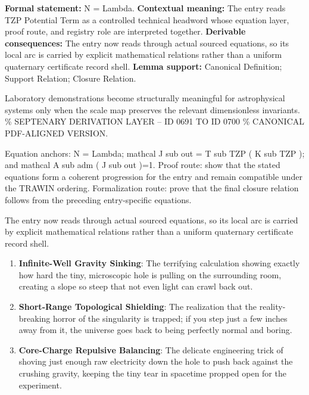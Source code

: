 \begingroup\footnotesize\setlength{\emergencystretch}{3em}\sloppy
\textbf{Formal statement:} N = Lambda. \textbf{Contextual meaning:} The entry reads TZP Potential Term as a controlled technical headword whose equation layer, proof route, and registry role are interpreted together. \textbf{Derivable consequences:} The entry now reads through actual sourced equations, so its local arc is carried by explicit mathematical relations rather than a uniform quaternary certificate record shell. \textbf{Lemma support:} Canonical Definition; Support Relation; Closure Relation.\par
\endgroup

Laboratory demonstrations become structurally meaningful for astrophysical systems only when the scale map preserves the relevant dimensionless invariants. \% SEPTENARY DERIVATION LAYER -- ID 0691 TO ID 0700 \% CANONICAL PDF-ALIGNED VERSION.

Equation anchors: N = Lambda; mathcal J sub out = T sub TZP ( K sub TZP ); and mathcal A sub adm ( J sub out )=1. Proof route: show that the stated equations form a coherent progression for the entry and remain compatible under the TRAWIN ordering. Formalization route: prove that the final closure relation follows from the preceding entry-specific equations.

The entry now reads through actual sourced equations, so its local arc is carried by explicit mathematical relations rather than a uniform quaternary certificate record shell.
\endgroup

\begin{enumerate}[leftmargin=1.6em,itemsep=6pt,topsep=4pt]
\item \textbf{Infinite-Well Gravity Sinking}: The terrifying calculation showing exactly how hard the tiny, microscopic hole is pulling on the surrounding room, creating a slope so steep that not even light can crawl back out.
\item \textbf{Short-Range Topological Shielding}: The realization that the reality-breaking horror of the singularity is trapped; if you step just a few inches away from it, the universe goes back to being perfectly normal and boring.
\item \textbf{Core-Charge Repulsive Balancing}: The delicate engineering trick of shoving just enough raw electricity down the hole to push back against the crushing gravity, keeping the tiny tear in spacetime propped open for the experiment.
\end{enumerate}


